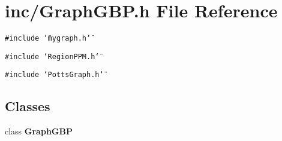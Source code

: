 \section{inc/GraphGBP.h File Reference}
\label{GraphGBP_8h}
{\tt \#include \char`\"{}mygraph.h\char`\"{}}\par
{\tt \#include \char`\"{}RegionPPM.h\char`\"{}}\par
{\tt \#include \char`\"{}PottsGraph.h\char`\"{}}\par
\subsection*{Classes}
\begin{CompactItemize}
\item 
class {\bf GraphGBP}
\end{CompactItemize}
